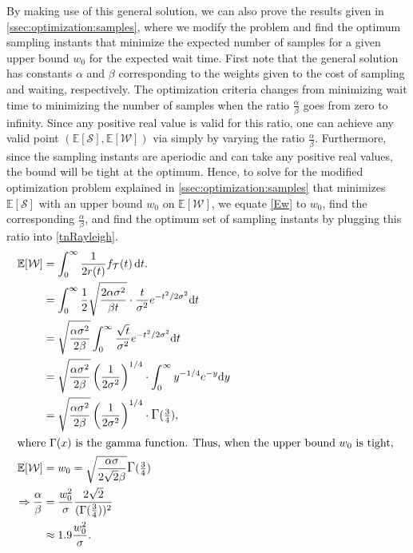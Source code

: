 By making use of this general solution, we can also prove the results given in \cref{ssec:optimization:samples}, where we modify the problem and find the optimum sampling instants that minimize the expected number of samples for a given upper bound $w_0$ for the expected wait time.
First note that the general solution has constants $\alpha$ and $\beta$ corresponding to the weights given to the cost of sampling and waiting, respectively.
The optimization criteria changes from minimizing wait time to minimizing the number of samples when the ratio $\frac{\alpha}{\beta}$ goes from zero to infinity.
Since any positive real value is valid for this ratio, one can achieve any valid point $(\mathbb{E}[\mathcal{S}],\mathbb{E}[\mathcal{W}])$ via simply by varying the ratio $\frac{\alpha}{\beta}$.
\newpage%
Furthermore, since the sampling instants are aperiodic and can take any positive real values, the bound will be tight at the optimum. 
Hence, to solve for the modified optimization problem explained in \cref{ssec:optimization:samples} that minimizes $\mathbb{E}[\mathcal{S}]$ with an upper bound $w_0$ on $\mathbb{E}[\mathcal{W}]$, we equate \cref{Ew} to $w_0$, find the corresponding $\frac{\alpha}{\beta}$, and find the optimum set of sampling instants by plugging this ratio into \cref{tnRayleigh}.
\begin{alignat*}{1}
\mathbb{E}[\mathcal{W}]&=\int_{0}^{\infty}\dfrac{1}{2r(t)}f_\mathcal{T}(t)\,\mathrm{d}t.\nonumber\\
&=\int_{0}^{\infty}\frac{1}{2}\sqrt{\frac{2\alpha\sigma^2}{\beta t}}\cdot \frac{t}{\sigma^2}e^{-{t^2}/{2\sigma^2}}\mathrm{d}t\\
&=\sqrt{\frac{\alpha\sigma^2}{2\beta}}\int_{0}^{\infty}\frac{\sqrt{t}}{\sigma^2}e^{-{t^2}/{2\sigma^2}}\mathrm{d}t\\
&=\sqrt{\frac{\alpha\sigma^2}{2\beta}}\left({\frac{1}{{2}\sigma^2}}\right)^{1/4}\cdot\int_{0}^{\infty}y^{-1/4}e^{-y}\mathrm{d}y\\
&=\sqrt{\frac{\alpha\sigma^2}{2\beta}}\left({\frac{1}{{2}\sigma^2}}\right)^{1/4}\cdot\mathlarger{\Gamma}(\tfrac{3}{4}),\\
\intertext{%
    where $\mathlarger{\Gamma(x)}$ is the gamma function.
    Thus, when the upper bound $w_0$ is tight,
}
\mathbb{E}[\mathcal{W}]&=w_0=\sqrt{\frac{\alpha\sigma}{2\sqrt{2}\beta}}\mathlarger{\Gamma}(\tfrac{3}{4})\\
\Rightarrow\frac{\alpha}{\beta}&=\frac{w_0^2}{\sigma}\frac{2\sqrt{2}}{(\mathlarger{\Gamma}(\tfrac{3}{4}))^2}\\
&\approx1.9\frac{w_0^2}{\sigma}.
\end{alignat*}
